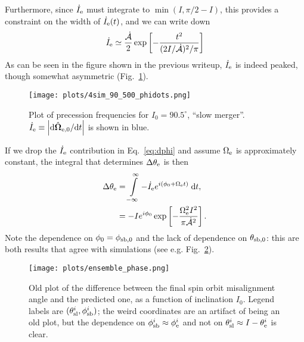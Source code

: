 \documentclass[11pt,
        usenames, %
        dvipsnames %
    ]{article}
\newcommand*{\rdil}[2]{\mathrm{d}#1 / \mathrm{d}#2}
\newcommand*{\bm}[1]{\boldsymbol{\mathbf{#1}}}
\newcommand*{\uv}[1]{\hat{\bm{#1}}}
\newcommand*{\abs}[1]{\left|#1\right|}
\newcommand*{\s}[1]{\left[#1\right]}
\begin{document}
Furthermore, since $\dot{I}_{\rm e}$ must integrate to $\min(I, \pi/2 - I)$,
this provides a constraint on the width of $\dot{I}_{\rm e}(t)$, and we can
write down
\begin{equation}
    \dot{I}_{\rm e} \simeq \frac{\dot{\mathcal{A}}}{2}
        \exp\s{-\frac{t^2}{(2 I / \dot{\mathcal{A}})^2 /\pi}}
\end{equation}
As can be seen in the figure shown in the previous writeup, $\dot{I}_{\rm e}$ is
indeed peaked, though somewhat asymmetric (Fig.~\ref{fig:phidots}).
\begin{figure}
    \centering
    \texttt{[image: plots/4sim\_90\_500\_phidots.png]}
    \caption{Plot of precession frequencies for $I_0 = 90.5^\circ$, ``slow
    merger''. $\dot{I}_{\rm e} \equiv \abs{\rdil{\uv{\Omega}_{\rm e,0}}{t}}$
    is shown in blue.}\label{fig:phidots}
\end{figure}
If we drop the $\dot{I}_{\rm e}$ contribution in Eq.~\eqref{eq:dphi} and assume
$\Omega_{\rm e}$ is approximately constant, the integral that determines $\Delta
\theta_{\rm e}$ is then
\begin{align}
    \Delta \theta_{\rm e} &= \int\limits_{-\infty}^\infty
            -\dot{I}_{\rm e}e^{i(\phi_0 + \Omega_{\rm e}t)}\;\mathrm{d}t,\\
        &= -I e^{i\phi_0}
            \exp\s{-\frac{\Omega_{\rm e}^2I^2}{\pi \dot{\mathcal{A}}^2}}.
\end{align}
Note the dependence on $\phi_0 = \phi_{\rm sb, 0}$ and the lack of dependence on
$\theta_{\rm sb, 0}$: this are both results that agree with simulations (see
e.g. Fig.~\ref{fig:ensemble_phase}).
\begin{figure}
    \centering
    \texttt{[image: plots/ensemble\_phase.png]}
    \caption{Old plot of the difference between the final spin orbit
    misalignment angle and the predicted one, as a function of inclination
    $I_0$. Legend labels are $(\theta_{\rm sl}^i, \phi_{\rm sb}^i)$; the weird
    coordinates are an artifact of being an old plot, but the dependence on
    $\phi_{\rm sb}^i \approx \phi_{\rm e}^i$ and not on $\theta_{\rm sl}^i
    \approx I - \theta_{\rm e}^i$ is clear.}\label{fig:ensemble_phase}
\end{figure}
\end{document}
